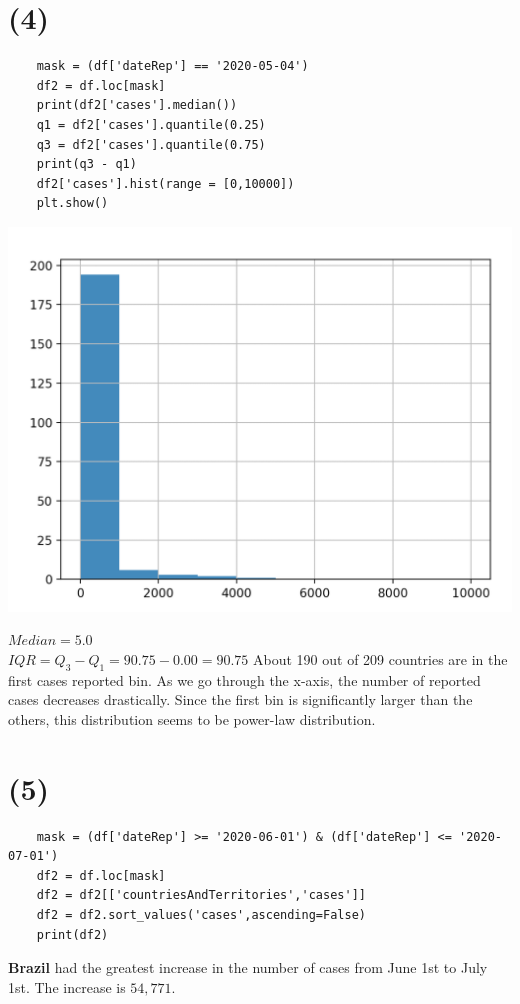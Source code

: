 \documentclass[12pt]{article}
\begin{document}
\section*{(4)}
\begin{lstlisting}
    mask = (df['dateRep'] == '2020-05-04')
    df2 = df.loc[mask]
    print(df2['cases'].median())
    q1 = df2['cases'].quantile(0.25)
    q3 = df2['cases'].quantile(0.75)
    print(q3 - q1)
    df2['cases'].hist(range = [0,10000])
    plt.show()
\end{lstlisting}
\begin{center}
    \includegraphics[scale=0.5]{fig/p4.png}
\end{center}
$Median = 5.0$\\
$IQR = Q_{3} - Q_{1} = 90.75 - 0.00 = 90.75$
About 190 out of 209 countries are in the first cases reported bin. As we go through the x-axis, the number of reported cases decreases drastically.
Since the first bin is significantly larger than the others, this distribution seems to be power-law distribution.

\section*{(5)}
\begin{lstlisting}
    mask = (df['dateRep'] >= '2020-06-01') & (df['dateRep'] <= '2020-07-01')
    df2 = df.loc[mask]
    df2 = df2[['countriesAndTerritories','cases']]
    df2 = df2.sort_values('cases',ascending=False)
    print(df2)
\end{lstlisting}
\textbf{Brazil} had the greatest increase in the number of cases from June 1st to July 1st. The increase is $54,771$.
\end{document}
